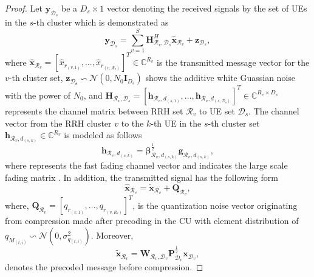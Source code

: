 \documentclass[conference,10pt,twocolumn,letter]{IEEEtran}
\begin{document}
\begin{proof}
Let $\boldsymbol{y}_{\mathcal{D}_s}$ be a $D_s \times 1$ vector denoting the received signals by the set of UEs in the $s$-th cluster which is demonstrated as 
\begin{equation} \label{1}
\boldsymbol{y}_{\mathcal{D}_s} = \sum_{v=1}^S \boldsymbol{H}^H_{\mathcal{R}_v,\mathcal{D}_s}\hat{\boldsymbol{x}}_{\mathcal{R}_v}+ \boldsymbol{z}_{\mathcal{D}_s},
\end{equation}
where $\hat{\boldsymbol{x}}_{ \mathcal{R}_v} = [\hat{x}_{ r_{(v,1)}},...,\hat{ x}_{ r_{(v,\mathcal{R}_v)}}]^T \in \mathbb{C}^{{R}_v } $ is the transmitted message vector for the $v$-th cluster set, $\boldsymbol{z_{\mathcal{D}_s}} \backsim \mathcal{N}(0,N_0\boldsymbol{I}_{{D}_s})$ shows the additive white Guassian noise with the power of $N_0$, and $\boldsymbol{H}_{\mathcal{R}_v,\mathcal{D}_s}=\left[\boldsymbol{h}_{\mathcal{R}_v,d_{(s,1)}},\ldots,\boldsymbol{h}_{\mathcal{R}_v,d_{(s,\mathcal{D}_s)}}\right]^T  \in \mathbb{C}^{{R}_v\times {D}_s}$ 
represents the channel matrix between RRH set $\mathcal{R}_v$ to UE set
$\mathcal{D}_s$. The channel vector from the RRH cluster $v$ to the $k$-th UE in the $s$-th cluster set $\boldsymbol{h}_{\mathcal{R}_v,d_{(s,k)}}\in \mathbb{C}^{{R}_v}$ is modeled as follows
\begin{equation}
\boldsymbol{h}_{\mathcal{R}_v,d_{(s,k)}} = \boldsymbol{\beta}^\frac{1}{2}_{\mathcal{R}_v,d_{(s,k)}} \boldsymbol{g}_{\mathcal{R}_v,d_{(s,k)}},
\end{equation}
where  represents the fast fading channel vector and 
indicates the large scale fading matrix \cite{88}. In addition, the transmitted signal has the following form
\begin{equation}
\label{eq_pow1}
 \hat{\boldsymbol{x}}_{\mathcal{R}_v} = \tilde{\boldsymbol{x}}_{\mathcal{R}_v} + \boldsymbol{Q}_{\mathcal{R}_v},
\end{equation}
where, $\boldsymbol{Q}_{\mathcal{R}_v} = \left[ q_{r_{(v,1)}},\ldots,q_{r_{(v,R_v)}}\right]^T$,  is the quantization noise vector originating from compression made after precoding in the CU with element distribution of
$q_{M_{(t,i)}}\backsim \mathcal{N}(0,\sigma_{q_{(t,i)}}^2) $. Moreover,
$$\tilde{\boldsymbol{x}}_{\mathcal{R}_v} = \textbf{W}_{\mathcal{R}_v,\mathcal{D}_v} \textbf{P}_{\mathcal{D}_v}^{\frac{1}{2}} \boldsymbol{x}_{ \mathcal{D}_v},$$
denotes the precoded message before compression.



\end{proof}
\end{document}
